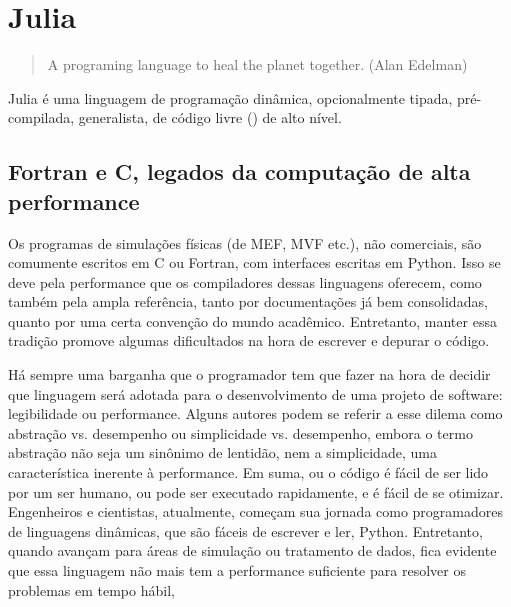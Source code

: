 \chapter{Julia}

\begin{quotation}
    A programing language to heal the planet together.
    (Alan Edelman)
\end{quotation}

Julia é uma linguagem de programação dinâmica, opcionalmente tipada, pré-compilada, generalista, de código livre () de alto nível. \cite[The scope of Julia]{Sherrington}




\section{Fortran e C, legados da computação de alta performance}

Os programas de simulações físicas (de MEF, MVF etc.), não comerciais, são comumente escritos em C ou Fortran, com interfaces escritas em Python. Isso se deve pela performance que os compiladores dessas linguagens oferecem, como também pela ampla referência, tanto por documentações já bem consolidadas, quanto por uma certa convenção do mundo acadêmico. Entretanto, manter essa tradição promove algumas dificultados na hora de escrever e depurar o código.


Há sempre uma barganha que o programador tem que fazer na hora de decidir que linguagem será adotada para o desenvolvimento de uma projeto de software: legibilidade ou performance. Alguns autores podem se referir a esse dilema como abstração vs. desempenho ou simplicidade vs. desempenho, embora o termo abstração não seja um sinônimo de lentidão, nem a simplicidade, uma característica inerente à performance. Em suma, ou o código é fácil de ser lido por um ser humano, ou pode ser executado rapidamente, e é fácil de se otimizar. Engenheiros e cientistas, atualmente, começam sua jornada como programadores de linguagens dinâmicas, que são fáceis de escrever e ler, Python. Entretanto, quando avançam para áreas de simulação ou tratamento de dados, fica evidente que essa linguagem não mais tem a performance suficiente para resolver os problemas em tempo hábil,

